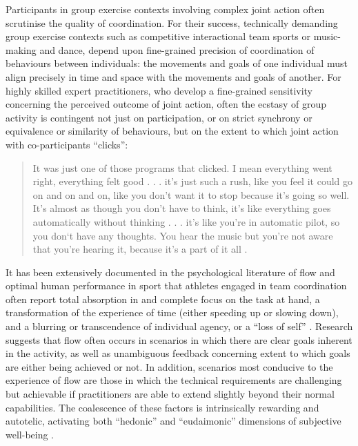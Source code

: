 \begin{CJK}{UTF8}{gbsn}
Participants in group exercise contexts involving complex joint action often scrutinise the quality of coordination.  For their success, technically demanding group exercise contexts such as competitive interactional team sports or music-making and dance, depend upon fine-grained precision of coordination of behaviours between individuals:  the movements and goals of one individual must align precisely in time and space with the movements and goals of another.  For highly skilled expert practitioners, who develop a fine-grained sensitivity concerning the perceived outcome of joint action, often the ecstasy of group activity is contingent not just on participation, or on strict synchrony or equivalence or similarity of behaviours, but on the extent to which joint action with co-participants ``clicks'':

  \begin{quotation}
    It was just one of those programs that clicked. I mean everything went right, everything felt good . . . it's just such a rush, like you feel it could go on and on and on, like you don't want it to stop because it's going so well. It's almost as though you don't have to think, it's like everything goes automatically without thinking . . . it's like you're in automatic pilot, so you don‘t have any thoughts. You hear the music but you're not aware that you're hearing it, because it's a part of it all \citep[]{Jackson1992}.
  \end{quotation}

It has been extensively documented in the psychological literature of flow and optimal human performance in sport that athletes engaged in team coordination often report total absorption in and complete focus on the task at hand, a transformation of the experience of time (either speeding up or slowing down), and a blurring or transcendence of individual agency, or a ``loss of self''   \citep{Csikszentmihalyi1992,Jackson1995,Jackson1999,McNeill1995}.  Research suggests that flow often occurs in scenarios in which there are clear goals inherent in the activity, as well as unambiguous feedback concerning extent to which goals are either being achieved or not.  In addition, scenarios most conducive to the experience of flow are those in which the technical requirements are challenging but achievable if practitioners are able to extend slightly beyond their normal capabilities\citep{Fong2015}.
The coalescence of these factors is intrinsically rewarding and autotelic\citep{Csikszentmihalyi1975}, activating both ``hedonic'' and ``eudaimonic'' dimensions of subjective well-being \citep{Huta2010,Fave2009}.


\end{CJK}
